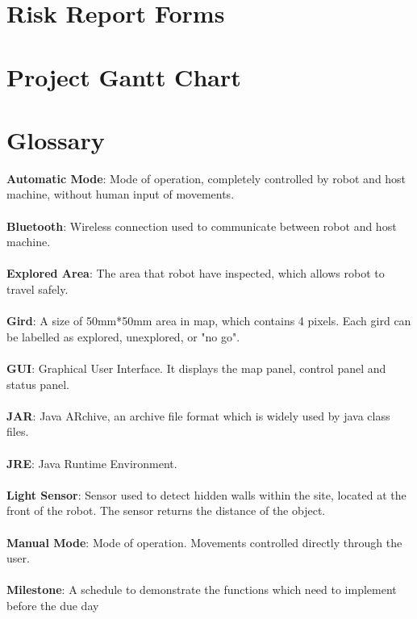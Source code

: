 \documentclass[11pt, a4paper]{report}
\begin{document}
\pagebreak


\newpage
\appendix

\chapter{Risk Report Forms}



\chapter{Project Gantt Chart}



\chapter{Glossary}
\textbf{Automatic Mode}:  Mode of operation, completely controlled by robot and host machine, without human input of movements. \\
\\ \textbf{Bluetooth}: Wireless connection used to communicate between robot and host machine.\\
\\ \textbf{Explored Area}: The area that robot have inspected, which allows robot to travel safely.  \\
\\ \textbf{Gird}: A size of 50mm*50mm area in map, which contains 4 pixels. Each gird can be labelled as explored, unexplored, or "no go".\\
\\ \textbf{GUI}: Graphical User Interface. It displays the map panel, control panel and status panel.\\
\\ \textbf{JAR}: Java ARchive, an archive file format which is widely used by java class files.\\
\\ \textbf{JRE}: Java Runtime Environment.\\ 
\\ \textbf{Light Sensor}: Sensor used to detect hidden walls within the site, located at the front of the robot. The sensor returns the distance of the object.\\
\\ \textbf{Manual Mode}: Mode of operation. Movements controlled directly through the user.\\
\\ \textbf{Milestone}: A schedule to demonstrate the functions which need to implement before the due day\\
\end{document}
